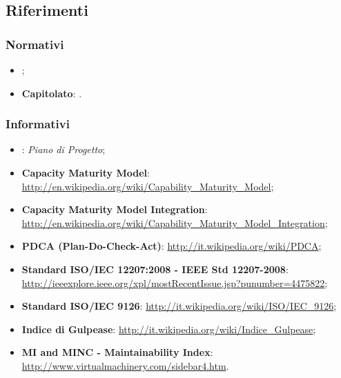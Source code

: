 \subsection{Riferimenti}
\subsubsection{Normativi}
\begin{itemize}
\item \textit{\NdPv};
\item \textbf{Capitolato}: .
\end{itemize}

\subsubsection{Informativi}
\begin{itemize}
\item \textbf{\PdP}: \textit{Piano di Progetto};
\item \textbf{Capacity Maturity Model}: \url{http://en.wikipedia.org/wiki/Capability_Maturity_Model};
\item \textbf{Capacity Maturity Model Integration}: \url{http://en.wikipedia.org/wiki/Capability_Maturity_Model_Integration};
\item \textbf{PDCA (Plan-Do-Check-Act)}: \url{http://it.wikipedia.org/wiki/PDCA};
\item \textbf{Standard ISO/IEC 12207:2008 - IEEE Std 12207-2008}: \url{http://ieeexplore.ieee.org/xpl/mostRecentIssue.jsp?punumber=4475822};
\item \textbf{Standard ISO/IEC 9126}: \url{http://it.wikipedia.org/wiki/ISO/IEC_9126};
\item \textbf{Indice di Gulpease}: \url{http://it.wikipedia.org/wiki/Indice_Gulpease};
\item \textbf{MI and MINC - Maintainability Index}: \url{http://www.virtualmachinery.com/sidebar4.htm}.
\end{itemize}
